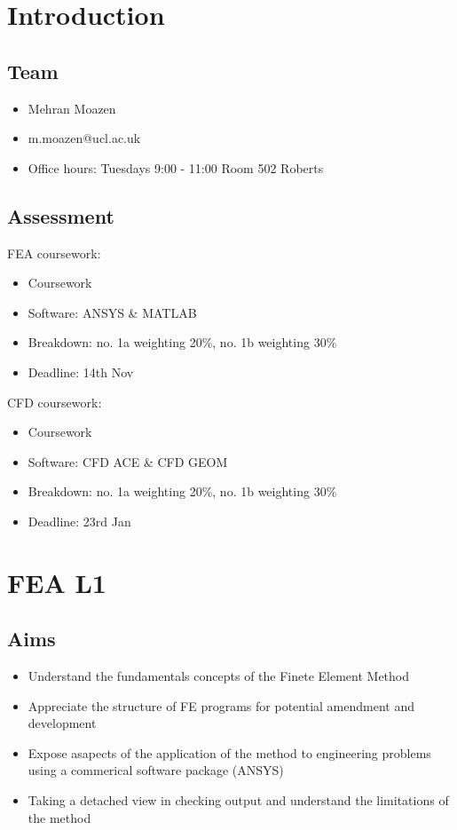 \section{Introduction}
\subsection{Team}
\begin{itemize}
	\item Mehran Moazen
	\item m.moazen@ucl.ac.uk
	\item Office hours: Tuesdays 9:00 - 11:00 Room 502 Roberts
\end{itemize}
\subsection{Assessment}
FEA coursework:
\begin{itemize}
	\item Coursework
	\item Software: ANSYS \& MATLAB
	\item Breakdown: no. 1a weighting 20\%, no. 1b weighting 30\%
	\item Deadline: 14th Nov
\end{itemize}
CFD coursework:
\begin{itemize}
	\item Coursework
	\item Software: CFD ACE \& CFD GEOM
	\item Breakdown: no. 1a weighting 20\%, no. 1b weighting 30\%
	\item Deadline: 23rd Jan
\end{itemize}
\section{FEA L1}
\subsection{Aims}
\begin{itemize}
	\item Understand the fundamentals concepts of the Finete Element Method
	\item Appreciate the structure of FE programs for potential amendment and development
	\item Expose asapects of the application of the method to engineering problems using a commerical software package (ANSYS)
	\item Taking a detached view in checking output and understand the limitations of the method
\end{itemize}

